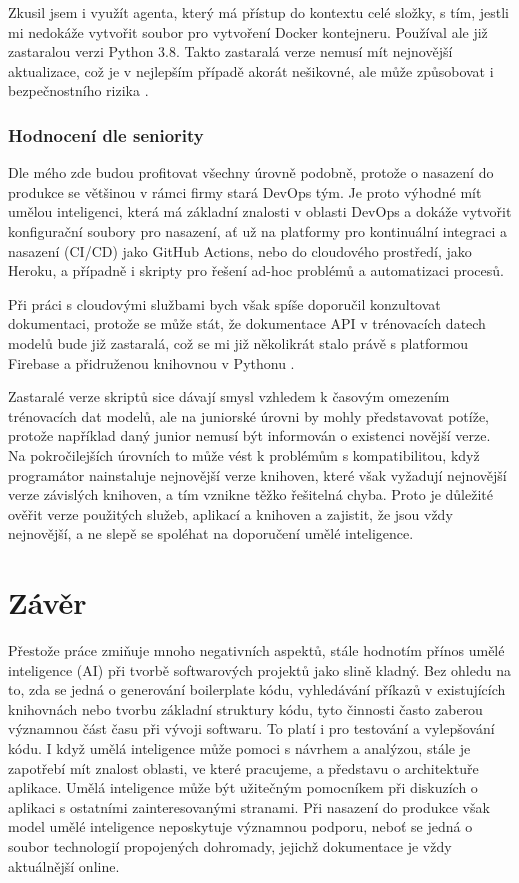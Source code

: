 \documentclass[FM,DP]{tulthesis}
\begin{document}
		Zkusil jsem i využít agenta, který má přístup do kontextu celé složky, s tím, jestli mi nedokáže vytvořit soubor pro vytvoření Docker kontejneru. Používal ale již zastaralou verzi Python 3.8. Takto zastaralá verze nemusí mít nejnovější aktualizace, což je v nejlepším případě akorát nešikovné, ale může způsobovat i bezpečnostního rizika \cite{agent_deploy}.
		
		\subsection{Hodnocení dle seniority}
		Dle mého zde budou profitovat všechny úrovně podobně, protože o nasazení do produkce se většinou v rámci firmy stará DevOps tým. Je proto výhodné mít umělou inteligenci, která má základní znalosti v oblasti DevOps a dokáže vytvořit konfigurační soubory pro nasazení, ať už na platformy pro kontinuální integraci a nasazení (CI/CD) jako GitHub Actions, nebo do cloudového prostředí, jako Heroku, a případně i skripty pro řešení ad-hoc problémů a automatizaci procesů. 
		
		Při práci s cloudovými službami bych však spíše doporučil konzultovat dokumentaci, protože se může stát, že dokumentace API v trénovacích datech modelů bude již zastaralá, což se mi již několikrát stalo právě s platformou Firebase a přidruženou knihovnou v Pythonu \cite{firebase} \cite{cicd} \cite{cicd2}.
		
		Zastaralé verze skriptů sice dávají smysl vzhledem k časovým omezením trénovacích dat modelů, ale na juniorské úrovni by mohly představovat potíže, protože například daný junior nemusí být informován o existenci novější verze. Na pokročilejších úrovních to může vést k problémům s kompatibilitou, když programátor nainstaluje nejnovější verze knihoven, které však vyžadují nejnovější verze závislých knihoven, a tím vznikne těžko řešitelná chyba. Proto je důležité ověřit verze použitých služeb, aplikací a knihoven a zajistit, že jsou vždy nejnovější, a ne slepě se spoléhat na doporučení umělé inteligence.
		
		\chapter{Závěr} 
		Přestože práce zmiňuje mnoho negativních aspektů, stále hodnotím přínos umělé inteligence (AI) při tvorbě softwarových projektů jako slině kladný. Bez ohledu na to, zda se jedná o generování boilerplate kódu, vyhledávání příkazů v existujících knihovnách nebo tvorbu základní struktury kódu, tyto činnosti často zaberou významnou část času při vývoji softwaru. To platí i pro testování a vylepšování kódu. I když umělá inteligence může pomoci s návrhem a analýzou, stále je zapotřebí mít znalost oblasti, ve které pracujeme, a představu o architektuře aplikace. Umělá inteligence může být užitečným pomocníkem při diskuzích o aplikaci s ostatními zainteresovanými stranami. Při nasazení do produkce však model umělé inteligence neposkytuje významnou podporu, neboť se jedná o soubor technologií propojených dohromady, jejichž dokumentace je vždy aktuálnější online.
		
\end{document}
